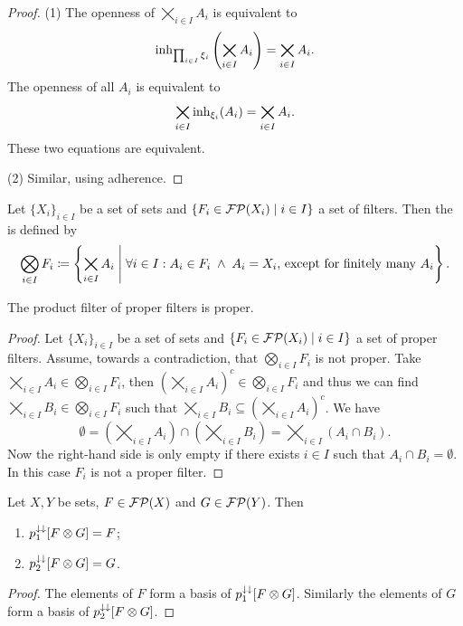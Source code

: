 \begin{proof}
(1) The openness of $\bigtimes_{i\in I}A_i$ is equivalent to 
\[\operatorname{inh}_{\prod_{i\in I}\xi_i}\left(\bigtimes_{i\in I}A_i\right) = \bigtimes_{i\in I}A_i. \]
The openness of all $A_i$ is equivalent to
\[\bigtimes_{i\in I}\operatorname{inh}_{\xi_i}(A_i) = \bigtimes_{i\in I}A_i. \]
These two equations are equivalent.

(2) Similar, using adherence.
\end{proof}

\begin{definition}
Let $\{X_i\}_{i\in I}$ be a set of sets and $\left\{ F_i \in \operatorname{\mathcal{FP}}(X_i) \;\middle|\; i\in I \right\}$ a set of filters. Then the  is defined by
\[ \bigotimes_{i\in I}F_i \coloneqq \left\{ \bigtimes_{i\in I}A_i \;\middle|\; \forall i\in I: A_i \in F_i \;\land\; A_i = X_i, \,\text{except for finitely many $A_i$} \right\}.  \]
\end{definition}

\begin{lemma}
The product filter of proper filters is proper.
\end{lemma}
\begin{proof}
Let $\{X_i\}_{i\in I}$ be a set of sets and $\left\{ F_i \in \operatorname{\mathcal{FP}}(X_i) \;\middle|\; i\in I \right\}$ a set of proper filters. Assume, towards a contradiction, that $\bigotimes_{i\in I}F_i$ is not proper. Take $\bigtimes_{i\in I}A_i\in \bigotimes_{i\in I}F_i$, then $\left(\bigtimes_{i\in I}A_i\right)^c \in \bigotimes_{i\in I}F_i$ and thus we can find $\bigtimes_{i\in I}B_i\in \bigotimes_{i\in I}F_i$ such that $\bigtimes_{i\in I}B_i \subseteq \left(\bigtimes_{i\in I}A_i\right)^c$. We have
\[ \emptyset = \left(\bigtimes_{i\in I}A_i\right) \cap \left(\bigtimes_{i\in I}B_i\right) = \bigtimes_{i\in I}(A_i\cap B_i). \]
Now the right-hand side is only empty if there exists $i\in I$ such that $A_i\cap B_i = \emptyset$. In this case $F_i$ is not a proper filter.
\end{proof}

\begin{lemma} \label{projectionsOfProductFilter}
Let $X,Y$ be sets, $F\in \operatorname{\mathcal{FP}}(X)$ and $G\in \operatorname{\mathcal{FP}}(Y)$. Then
\begin{enumerate}
\item $p_1^{\downarrow\downarrow}[F\otimes G] = F$;
\item $p_2^{\downarrow\downarrow}[F\otimes G] = G$.
\end{enumerate}
\end{lemma}
\begin{proof}
The elements of $F$ form a basis of $p_1^{\downarrow\downarrow}[F\otimes G]$. Similarly the elements of $G$ form a basis of $p_2^{\downarrow\downarrow}[F\otimes G]$.
\end{proof}

